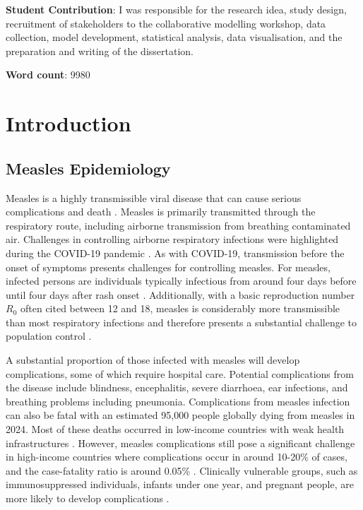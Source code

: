 \documentclass[12pt]{article}
\newcounter{who}
\begin{document}
\vspace{2em}
\noindent
\textbf{Student Contribution}:
I was responsible for the research idea, study design, recruitment of stakeholders to the collaborative modelling workshop, data collection, model development, statistical analysis, data visualisation, and the preparation and writing of the dissertation. 

\vspace{2em}
\noindent
\textbf{Word count}: 9980


\newpage
\section{Introduction}
\label{sec:intro}

\subsection{Measles Epidemiology}

Measles is a highly transmissible viral disease that can cause serious complications and death \cite{WHO_measles_topic}. Measles is primarily transmitted through the respiratory route, including airborne transmission from breathing contaminated air. Challenges in controlling airborne respiratory infections were highlighted during the COVID-19 pandemic \cite{who_covid_ventilation_2021}. As with COVID-19, transmission before the onset of symptoms presents challenges for controlling measles. For measles, infected persons are individuals typically infectious from around four days before until four days after rash onset \cite{WHO_measles_topic}. Additionally, with a basic reproduction number $R_0$ often cited between 12 and 18, measles is considerably more transmissible than most respiratory infections and therefore presents a substantial challenge to population control \cite{alimohamadi2020estimate, guerra2017basic}.  

A substantial proportion of those infected with measles will develop complications, some of which require hospital care. Potential complications from the disease include blindness, encephalitis, severe diarrhoea, ear infections, and breathing problems including pneumonia. Complications from measles infection can also be fatal with an estimated 95,000 people globally dying from measles in 2024. Most of these deaths occurred in low-income countries with weak health infrastructures \cite{WHO_measles_topic}. However, measles complications still pose a significant challenge in high-income countries where complications occur in around 10-20\% of cases, and the case-fatality ratio is around 0.05\% \cite{wolfson2009estimates, NICE2024MeaslesComplications}. Clinically vulnerable groups, such as immunosuppressed individuals, infants under one year, and pregnant people, are more likely to develop complications \cite{NHSEngland2024MeaslesGuidance}.
\end{document}
